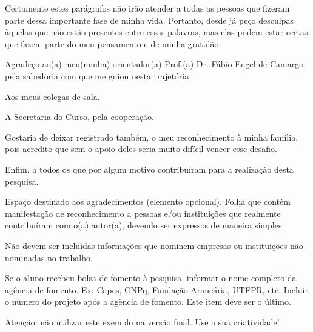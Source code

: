 
\begin{agradecimentos}%

Certamente estes parágrafos não irão atender a todas as pessoas que fizeram parte dessa importante fase de minha vida. Portanto, desde já peço desculpas àquelas que não estão presentes entre essas palavras, mas elas podem estar certas que fazem parte do meu pensamento e de minha gratidão. 

Agradeço ao(a) meu(minha) orientador(a) Prof.(a) Dr. Fábio Engel de Camargo, pela sabedoria com que me guiou nesta trajetória.

Aos meus colegas de sala.

A Secretaria do Curso, pela cooperação.

Gostaria de deixar registrado também, o meu reconhecimento à minha família, pois acredito que sem o apoio deles seria muito difícil vencer esse desafio. 

Enfim, a todos os que por algum motivo contribuíram para a realização desta pesquisa.


Espaço destinado aos agradecimentos (elemento opcional). Folha que contém manifestação de reconhecimento a pessoas e/ou instituições que realmente contribuíram com o(a) autor(a), devendo ser expressos de maneira simples.

Não devem ser incluídas informações que nominem empresas ou instituições não nominadas no trabalho.

Se o aluno recebeu bolsa de fomento à pesquisa, informar o nome completo da agência de fomento. Ex: Capes, CNPq, Fundação Araucária, UTFPR, etc. Incluir o número do projeto após a agência de fomento. Este item deve ser o último.

Atenção: não utilizar este exemplo na versão final. Use a sua criatividade!

\end{agradecimentos}

